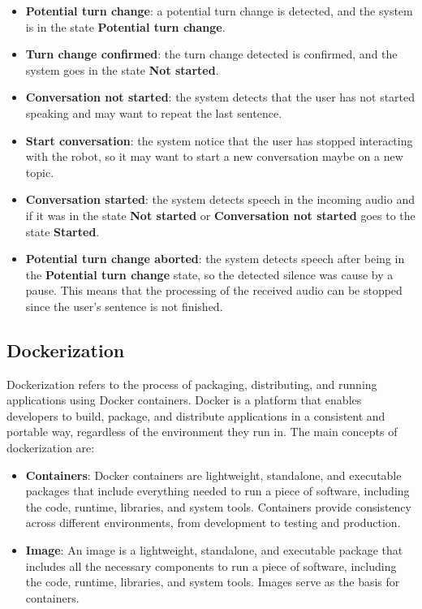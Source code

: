 \documentclass[../main.tex]{subfiles}
\begin{document}
\begin{itemize}
    \item \textbf{Potential turn change}: a potential turn change is detected, and the system is in the state \textbf{Potential turn change}.
    \item \textbf{Turn change confirmed}: the turn change detected is confirmed, and the system goes in the state \textbf{Not started}.
    \item \textbf{Conversation not started}: the system detects that the user has not started speaking and may want to repeat the last sentence.
    \item \textbf{Start conversation}: the system notice that the user has stopped interacting with the robot, so it may want to start a new conversation maybe on a new topic.
    \item \textbf{Conversation started}: the system detects speech in the incoming audio and if it was in the state \textbf{Not started} or \textbf{Conversation not started} goes to the state \textbf{Started}.
    \item \textbf{Potential turn change aborted}: the system detects speech after being in the \textbf{Potential turn change} state, so the detected silence was cause by a pause. This means that the processing of the received audio can be stopped since the user's sentence is not finished.
\end{itemize}


\subsection{Dockerization}

Dockerization refers to the process of packaging, distributing, and running applications using Docker containers. Docker is a platform that enables developers to build, package, and distribute applications in a consistent and portable way, regardless of the environment they run in. The main concepts of dockerization are:

\begin{itemize}
    \item \textbf{Containers}: Docker containers are lightweight, standalone, and executable packages that include everything needed to run a piece of software, including the code, runtime, libraries, and system tools. Containers provide consistency across different environments, from development to testing and production.
    \item \textbf{Image}: An image is a lightweight, standalone, and executable package that includes all the necessary components to run a piece of software, including the code, runtime, libraries, and system tools. Images serve as the basis for containers.
\end{itemize}
\end{document}
